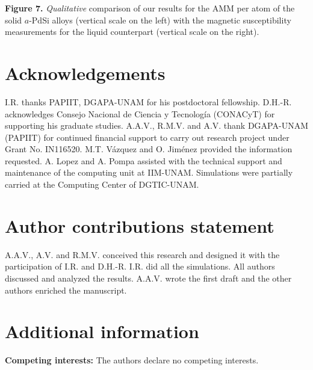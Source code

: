 \documentclass[fleqn,12pt]{wlscirep}
\begin{document}
\noindent \textbf{Figure 7.} \textit{Qualitative} comparison of our results for the AMM per atom of the solid $a$-PdSi alloys (vertical scale on the left) with the magnetic susceptibility measurements for the liquid counterpart (vertical scale on the right).

\pagebreak

\section*{Acknowledgements}

I.R. thanks PAPIIT, DGAPA-UNAM for his postdoctoral fellowship. D.H.-R. acknowledges Consejo Nacional de Ciencia y Tecnología (CONACyT) for supporting his graduate studies. A.A.V., R.M.V. and A.V. thank DGAPA-UNAM (PAPIIT) for continued financial support to carry out research project under Grant No. IN116520. M.T. Vázquez and O. Jiménez provided the information requested. A. Lopez and A. Pompa assisted with the technical support and maintenance of the computing unit at IIM-UNAM. Simulations were partially carried at the Computing Center of DGTIC-UNAM.

\section*{Author contributions statement}

A.A.V., A.V. and R.M.V. conceived this research and designed it with the participation of I.R. and D.H.-R. I.R. did all the simulations. All authors discussed and analyzed the results. A.A.V. wrote the first draft and the other authors enriched the manuscript.

\section*{Additional information}

\textbf{Competing interests:} The authors declare no competing interests.
\end{document}
